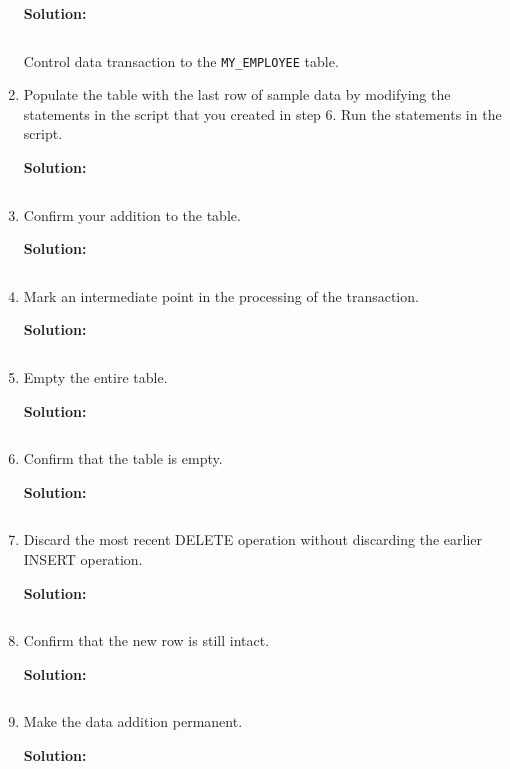 \begin{enumerate}
    \textbf{Solution: }
    \begin{lstlisting}[language=SQL]
    \end{lstlisting}  
Control data transaction to the \texttt{MY\_EMPLOYEE} table.
    \item Populate the table with the last row of sample data by modifying the statements in the script that you
created in step 6. Run the statements in the script.
    
    \textbf{Solution: }
    \begin{lstlisting}[language=SQL]
    \end{lstlisting}  
    \item Confirm your addition to the table.
    
    \textbf{Solution: }
    \begin{lstlisting}[language=SQL]
    \end{lstlisting} 
    \item Mark an intermediate point in the processing of the transaction.
    
    \textbf{Solution: }
    \begin{lstlisting}[language=SQL]
    \end{lstlisting}
    \item Empty the entire table.
    
    \textbf{Solution: }
    \begin{lstlisting}[language=SQL]
    \end{lstlisting}
    \item Confirm that the table is empty.
    
    \textbf{Solution: }
    \begin{lstlisting}[language=SQL]
    \end{lstlisting}
    \item Discard the most recent DELETE operation without discarding the earlier INSERT operation.
    
    \textbf{Solution: }
    \begin{lstlisting}[language=SQL]
    \end{lstlisting}
    \item Confirm that the new row is still intact.
    
    \textbf{Solution: }
    \begin{lstlisting}[language=SQL]
    \end{lstlisting}
    \item Make the data addition permanent.
    
    \textbf{Solution: }
    \begin{lstlisting}[language=SQL]
    \end{lstlisting}
\end{enumerate}